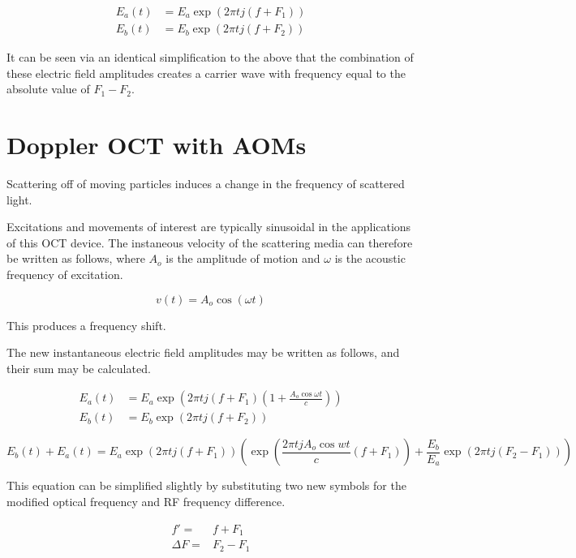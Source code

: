 \begin{align}
E_a(t) & = E_a \exp{(2 \pi t j (f + F_1))} \\
E_b(t) & = E_b \exp{(2 \pi t j (f + F_2))}
\end{align}

It can be seen via an identical simplification to the above that the combination of these electric field amplitudes creates a carrier wave with frequency equal to the absolute value of $F_1 - F_2$.

\section{Doppler OCT with AOMs}
\label{sec:doppler_aom}

Scattering off of moving particles induces a change in the frequency of scattered light.


Excitations and movements of interest are typically sinusoidal in the applications of this OCT device. The instaneous velocity of the scattering media can therefore be written as follows, where $A_o$ is the amplitude of motion and $\omega$ is the acoustic frequency of excitation.

\begin{equation} \label{eq:media_v}
v(t) = A_o \cos{(\omega t)}
\end{equation}

This produces a frequency shift.


The new instantaneous electric field amplitudes may be written as follows, and their sum may be calculated.

\begin{align}
E_a(t) & = E_a \exp{(2 \pi t j (f + F_1)(1 + \frac{A_o\cos{\omega t}}{c}))} \\
E_b(t) & = E_b \exp{(2 \pi t j (f + F_2))}
\end{align}

\begin{dmath}
E_b(t) + E_a(t) = E_a \exp{(2 \pi t j (f + F_1))}\left(\exp{\left(\frac{2 \pi t j A_o \cos{wt}}{c}(f + F_1)\right)} + \frac{E_b}{E_a} \exp{(2 \pi t j (F_2 - F_1))}\right)
\end{dmath}

This equation can be simplified slightly by substituting two new symbols for the modified optical frequency and RF frequency difference.

\begin{align*}
f' = & f + F_1 \\
\Delta F = & F_2 - F_1
\end{align*}

